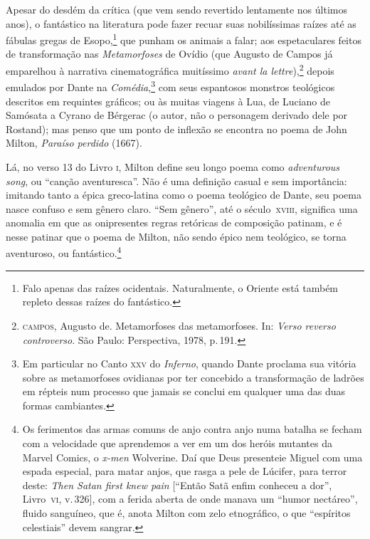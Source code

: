 Apesar do desdém da crítica (que vem sendo revertido lentamente nos
últimos anos), o fantástico na literatura pode fazer recuar suas
nobilíssimas raízes até as fábulas gregas de Esopo,\footnote{Falo apenas
  das raízes ocidentais. Naturalmente, o Oriente está também repleto
  dessas raízes do fantástico.} que punham os animais a falar; aos
espetaculares feitos de transformação nas \emph{Metamorfoses} de Ovídio
(que Augusto de Campos já emparelhou à narrativa cinematográfica
muitíssimo \emph{avant la lettre}),\footnote{\textsc{campos}, Augusto de. Metamorfoses das
  metamorfoses. In: \emph{Verso reverso
  controverso}. São Paulo: Perspectiva, 1978, p.\,191.} depois emulados por
Dante na \emph{Comédia},\footnote{Em particular no Canto \textsc{xxv} do \emph{Inferno},
  quando Dante proclama sua vitória sobre as metamorfoses ovidianas por
  ter concebido a transformação de ladrões em répteis num processo que
  jamais se conclui em qualquer uma das duas formas cambiantes.} com
seus espantosos monstros teológicos descritos em requintes gráficos; ou
às muitas viagens à Lua, de Luciano de Samósata a Cyrano de Bérgerac (o
autor, não o personagem derivado dele por Rostand); mas penso que um
ponto de inflexão se encontra no poema de John Milton, \emph{Paraíso perdido} (1667).

Lá, no verso 13 do Livro \textsc{i}, Milton define seu longo poema como
\emph{adventurous song}, ou ``canção aventuresca''. Não é uma definição
casual e sem importância: imitando tanto a épica greco-latina como o
poema teológico de Dante, seu poema nasce confuso e sem gênero claro.
``Sem gênero'', até o século~\textsc{xviii}, significa uma anomalia em que as
onipresentes regras retóricas de composição patinam, e é nesse patinar
que o poema de Milton, não sendo épico nem teológico, se torna
aventuroso, ou fantástico.\footnote{Os ferimentos das armas comuns de
  anjo contra anjo numa batalha se fecham com a velocidade que
  aprendemos a ver em um dos heróis mutantes da Marvel Comics, o
  \emph{x-men} Wolverine. Daí que Deus presenteie Miguel com uma espada
  especial, para matar anjos, que rasga a pele de Lúcifer, para terror
  deste: \emph{Then Satan first knew pain} [``Então Satã enfim conheceu
  a dor'', Livro~\textsc{vi}, v.\,326], com a ferida aberta de onde manava um
  ``humor nectáreo'', fluido sanguíneo, que é, anota Milton com zelo
  etnográfico, o que ``espíritos celestiais'' devem sangrar.}

